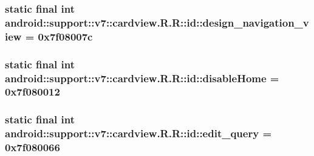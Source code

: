 \hypertarget{classandroid_1_1support_1_1v7_1_1cardview_1_1_r_1_1id_d9b664fc08dca7955faf8bb8fd932386}{
\subsubsection[{design\_\-navigation\_\-view}]{\setlength{\rightskip}{0pt plus 5cm}static final int android::support::v7::cardview.R.R::id::design\_\-navigation\_\-view = 0x7f08007c}}
\label{classandroid_1_1support_1_1v7_1_1cardview_1_1_r_1_1id_d9b664fc08dca7955faf8bb8fd932386}


\hypertarget{classandroid_1_1support_1_1v7_1_1cardview_1_1_r_1_1id_d3dbeb4450d121dc8a7fe9aff99971db}{
\subsubsection[{disableHome}]{\setlength{\rightskip}{0pt plus 5cm}static final int android::support::v7::cardview.R.R::id::disableHome = 0x7f080012}}
\label{classandroid_1_1support_1_1v7_1_1cardview_1_1_r_1_1id_d3dbeb4450d121dc8a7fe9aff99971db}


\hypertarget{classandroid_1_1support_1_1v7_1_1cardview_1_1_r_1_1id_730c74d02973021d85e10a5d22aea59f}{
\subsubsection[{edit\_\-query}]{\setlength{\rightskip}{0pt plus 5cm}static final int android::support::v7::cardview.R.R::id::edit\_\-query = 0x7f080066}}
\label{classandroid_1_1support_1_1v7_1_1cardview_1_1_r_1_1id_730c74d02973021d85e10a5d22aea59f}


